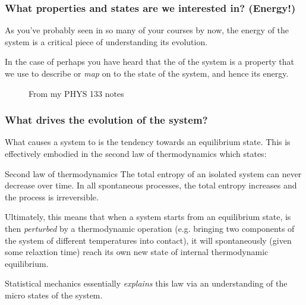 \documentclass[hyperref={colorlinks=true}]{beamer}
\begin{document}
\begin{frame}%
  \frametitle{What properties and states are we interested in? (Energy!)}

  As you've probably seen in so many of your courses by now, the energy of the system is a critical piece of understanding its evolution.
  
  \vspace{0.3cm}
  
  In the case of  perhaps you have heard that the  of the system is a property that we use to describe or \textit{map} on to the state of the system, and hence its energy.

  \begin{figure}
    \centering
    \caption{From my PHYS 133 notes}
  \end{figure}

\end{frame}


\begin{frame}%
  \frametitle{What drives the evolution of the system?}

  What causes a system to  is the tendency towards an equilibrium state. This is effectively embodied in the second law of thermodynamics which states:
  
  \begin{ucblock}{Second law of thermodynamics}
    The total entropy of an isolated system can never decrease over time. In all spontaneous processes, the total entropy increases and the process is irreversible. 
  \end{ucblock}
  
  Ultimately, this means that when a system starts from an equilibrium state, is then \textit{perturbed} by a thermodynamic operation (e.g. bringing two components of the system of different temperatures into contact), it will spontaneously (given some relaxtion time) reach its own new state of internal thermodynamic equilibrium.
  
  \vspace{0.3cm}
  
  Statistical mechanics essentially \textit{explains} this law via an understanding of the micro states of the system.

\end{frame}
\end{document}
